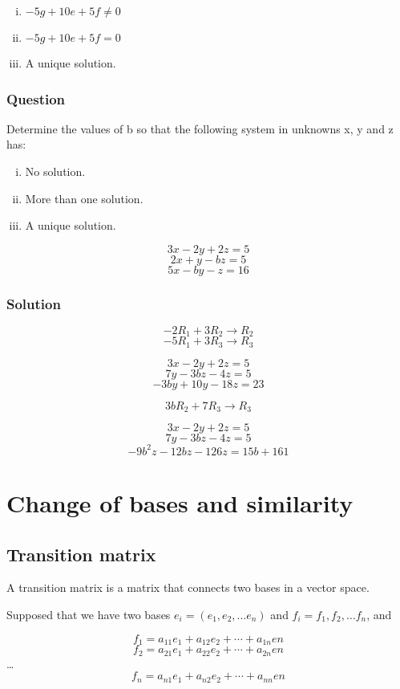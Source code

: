 \documentclass{book}
\begin{document}
\begin{enumerate}[(i)]
	\item \(-5g + 10e + 5f \ne 0\)
	\item \(-5g + 10e + 5f = 0\)
	\item A unique solution.
\end{enumerate}

\subsection{Question}

Determine the values of b so that the following system in unknowns x, y and z has:

\begin{enumerate}[(i)]
	\item No solution.
	\item More than one solution.
	\item A unique solution.
\end{enumerate}

\[3x - 2y + 2z = 5\]
\[2x + y - bz = 5\]
\[5x - by - z = 16\]

\subsection*{Solution}

\[-2 R_1 + 3 R_2 \rightarrow R_2\]
\[-5 R_1 + 3 R_3 \rightarrow R_3\]

\[3x - 2y + 2z = 5\]
\[7y - 3bz - 4z = 5\]
\[-3by + 10y - 18z = 23\]

\[3b R_2 + 7 R_3 \rightarrow R_3\]

\[3x - 2y + 2z = 5\]
\[7y - 3bz - 4z = 5\]
\[- 9b^2z - 12bz - 126z = 15b + 161\]

\chapter{Change of bases and similarity}

\section{Transition matrix}

A transition matrix is a matrix that connects two bases in a vector space.

Supposed that we have two bases \(e_i = (e_1, e_2, \ldots e_n)\) and \(f_i = f_1, f_2, \ldots f_n\), and

\[f_1 = a_{11}e_1 + a_{12}e_2 + \cdots + a_{1n}en\]
\[f_2 = a_{21}e_1 + a_{22}e_2 + \cdots + a_{2n}en\]
\ldots
\[f_n = a_{n1}e_1 + a_{n2}e_2 + \cdots + a_{nn}en\]
\end{document}
